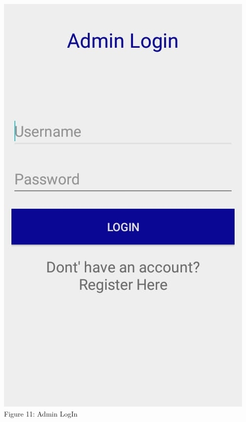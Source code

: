 \documentclass{article}
\begin{document}
\begin{center}
\includegraphics[scale=0.32]{f6}
\\Figure 11: Admin LogIn
\end{center}
\end{document}
